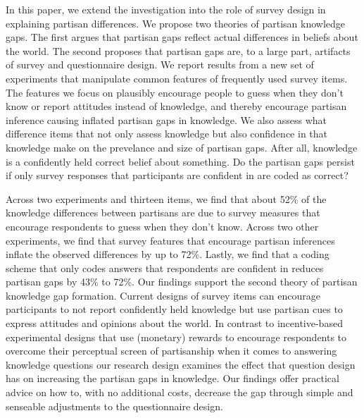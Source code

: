 \documentclass[12pt, letterpaper]{article}
\begin{document}
In this paper, we extend the investigation into the role of survey design in explaining partisan differences. We propose two theories of partisan knowledge gaps. The first argues that partisan gaps reflect actual differences in beliefs about the world. The second proposes that partisan gaps are, to a large part, artifacts of survey and questionnaire design. We report results from a new set of experiments that manipulate common features of frequently used survey items. The features we focus on plausibly encourage people to guess when they don't know or report attitudes instead of knowledge, and thereby encourage partisan inference causing inflated partisan gaps in knowledge. We also assess what difference items that not only assess knowledge but also confidence in that knowledge make on the prevelance and size of partisan gaps. After all, knowledge is a confidently held correct belief about something. Do the partisan gaps persist if only survey responses that participants are confident in are coded as correct?

Across two experiments and thirteen items, we find that about 52\% of the knowledge differences between partisans are due to survey measures that encourage respondents to guess when they don't know. Across two other experiments, we find that survey features that encourage partisan inferences inflate the observed differences by up to 72\%. Lastly, we find that a coding scheme that only codes answers that respondents are confident in reduces partisan gaps by 43\% to 72\%. Our findings support the second theory of partisan knowledge gap formation. Current designs of survey items can encourage participants to not report confidently held knowledge but use partisan cues to express attitudes and opinions about the world. In contrast to incentive-based experimental designs that use (monetary) rewards to encourage respondents to overcome their perceptual screen of partisanship when it comes to answering knowledge questions \citep[for example, see][]{bullocketal_2015, peterson2021partisan} our research design examines the effect that question design has on increasing the partisan gaps in knowledge. Our findings offer practical advice on how to, with no additional costs, decrease the gap through simple and senseable adjustments to the questionnaire design.
\end{document}
